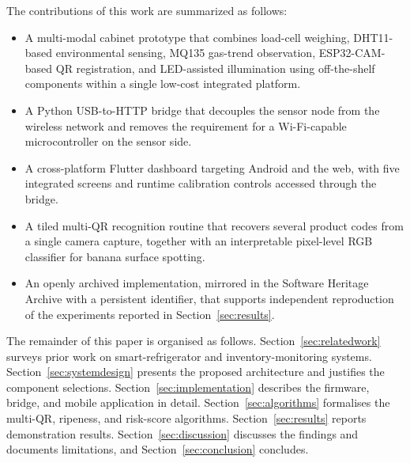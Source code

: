 The contributions of this work are summarized as follows:

\begin{itemize}
  \item A multi-modal cabinet prototype that combines load-cell
        weighing, DHT11-based environmental sensing, MQ135 gas-trend
        observation, ESP32-CAM-based QR registration, and LED-assisted
        illumination using off-the-shelf components within a single
        low-cost integrated platform.
  \item A Python USB-to-HTTP bridge that decouples the sensor node
        from the wireless network and removes the requirement for a
        Wi-Fi-capable microcontroller on the sensor side.
  \item A cross-platform Flutter dashboard targeting Android and the
        web, with five integrated screens and runtime calibration
        controls accessed through the bridge.
  \item A tiled multi-QR recognition routine that recovers several
        product codes from a single camera capture, together with an
        interpretable pixel-level RGB classifier for banana surface
        spotting.
  \item An openly archived implementation, mirrored in the Software
        Heritage Archive with a persistent identifier, that supports
        independent reproduction of the experiments reported in
        Section~\ref{sec:results}.
\end{itemize}

The remainder of this paper is organised as follows.
Section~\ref{sec:relatedwork} surveys prior work on smart-refrigerator
and inventory-monitoring systems.
Section~\ref{sec:systemdesign} presents the proposed architecture and
justifies the component selections.
Section~\ref{sec:implementation} describes the firmware, bridge, and
mobile application in detail.
Section~\ref{sec:algorithms} formalises the multi-QR, ripeness, and
risk-score algorithms. Section~\ref{sec:results} reports demonstration
results. Section~\ref{sec:discussion} discusses the findings and
documents limitations, and Section~\ref{sec:conclusion} concludes.

